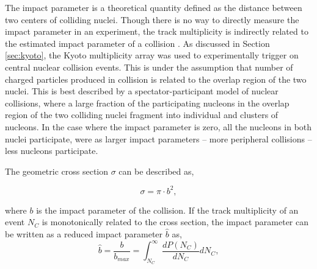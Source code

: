 The impact parameter is a theoretical quantity defined as the distance between two centers of colliding nuclei. Though there is no way to directly measure the impact parameter in an experiment, the track multiplicity is indirectly related to the estimated impact parameter of a collision \cite{impactpar}. As discussed in Section \ref{sec:kyoto}, the Kyoto multiplicity array was used to experimentally trigger on central nuclear collision events. This is under the assumption that number of charged particles produced in collision is related to the overlap region of the two nuclei. This is best described by a spectator-participant model of nuclear collisions, where a large fraction of the participating nucleons in the overlap region of the two colliding nuclei fragment into individual and clusters of nucleons. In the case where the impact parameter is zero, all the nucleons in both nuclei participate, were as larger impact parameters -- more peripheral collisions -- less nucleons participate. 



The geometric cross section $\sigma$ can be described as, 

\begin{equation}
\sigma = \pi \cdot b^2,
\label{eq:crossSect}
\end{equation}

where $b$ is the impact parameter of the collision.  If the track multiplicity of an event $N_C$ is monotonically related to the cross section, the impact parameter can be written as a reduced impact parameter $\hat{b}$ as,
\begin{equation}
\hat{b} =  \frac{b}{b_{max}} = \int^{\infty}_{N_C} \frac{dP(N_C)}{dN_C} dN_C,
\end{equation}

